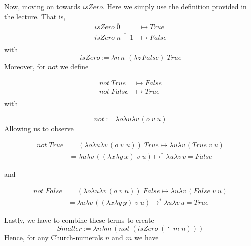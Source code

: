 \documentclass{article}
\begin{document}
Now, moving on towards $\textit{isZero}$. Here we simply use the definition provided in the lecture. That is,
\begin{equation*}
\begin{split}
\textit{isZero} \; \overline{0}  &\mapsto True\\
\textit{isZero} \; \overline{n+1} &\mapsto False \\
\end{split}
\end{equation*}
with 
\begin{equation*}
\textit{isZero}:= \lambda n \, n \;(\lambda z \, False)\; True
\end{equation*}
Moreover, for $\textit{not}$ we define 

\begin{equation*}
\begin{split}
\textit{not} \; True &\mapsto False\\
\textit{not} \; False  &\mapsto True \\
\end{split}
\end{equation*}
with 

\begin{equation*}
\textit{not}:= \lambda o \lambda u \lambda v \, (o \; v \; u)
\end{equation*}
Allowing us to observe

\begin{equation*}
\begin{split}
\textit{not} \; True &= (\lambda o \lambda u \lambda v \, (o \; v \; u))\; True \mapsto  \lambda u \lambda v \, (True \; v \; u) \\
 &= \lambda u \lambda v \, ((\lambda x \lambda y \, x) \; v \; u) \mapsto^* \lambda u \lambda v \,  v = False
 \end{split}
\end{equation*}

and


\begin{equation*}
\begin{split}
\textit{not} \; False &= (\lambda o \lambda u \lambda v \, (o \; v \; u))\; False \mapsto  \lambda u \lambda v \, (False \; v \; u) \\
 &= \lambda u \lambda v \, ((\lambda x \lambda y \, y) \; v \; u) \mapsto^* \lambda u \lambda v \,  u = True
 \end{split}
\end{equation*}

Lastly, we have to combine these terms to create 
\begin{equation*}
\textit{Smaller}:= \lambda n \lambda m \, (\textit{not}\; (\textit{isZero}\; (\dotminus \; m \; n)))
\end{equation*}
Hence, for any Church-numerals $\overline{n}$ and $\overline{m}$ we have
\end{document}
